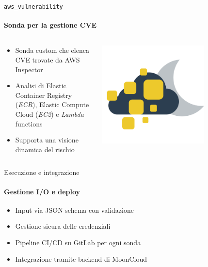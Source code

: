 \documentclass{beamer}
\begin{document}
\begin{frame}{\texttt{aws\_vulnerability}}
    \framesubtitle{Sonda per la gestione CVE}
    \begin{columns}
        \begin{column}{0.4\textwidth}
            \begin{itemize}
            \item Sonda custom che elenca CVE trovate da AWS Inspector
            \item Analisi di Elastic Container Registry (\emph{ECR}), 
                Elastic Compute Cloud (\emph{EC2}) e \emph{Lambda} functions
            \item Supporta una visione dinamica del rischio
        \end{itemize}
        \end{column}
        \begin{column}{0.6\textwidth}
            \includegraphics[width=0.7\textwidth]{assets/mooncloud.png}
        \end{column}
    \end{columns}
\end{frame}

\begin{frame}{Esecuzione e integrazione}
    \framesubtitle{Gestione I/O e deploy}
    \begin{itemize}
        \item Input via JSON schema con validazione
        \item Gestione sicura delle credenziali
        \item Pipeline CI/CD su GitLab per ogni sonda
        \item Integrazione tramite backend di MoonCloud
    \end{itemize}
\end{frame}
\end{document}
